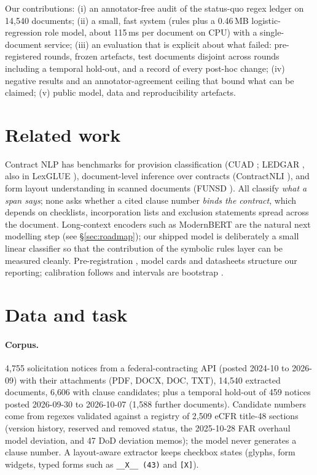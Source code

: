 \documentclass[11pt]{article}
\begin{document}
Our contributions: (i) an annotator-free audit of the status-quo regex ledger on 14{,}540 documents; (ii) a small, fast system (rules plus a 0.46\,MB logistic-regression role model, about 115\,ms per document on CPU) with a single-document service; (iii) an evaluation that is explicit about what failed: pre-registered rounds, frozen artefacts, test documents disjoint across rounds including a temporal hold-out, and a record of every post-hoc change; (iv) negative results and an annotator-agreement ceiling that bound what can be claimed; (v) public model, data and reproducibility artefacts.

\section{Related work}
Contract NLP has benchmarks for provision classification (CUAD \cite{hendrycks2021cuad}; LEDGAR \cite{tuggener2020ledgar}, also in LexGLUE \cite{chalkidis2022lexglue}), document-level inference over contracts (ContractNLI \cite{koreeda2021contractnli}), and form layout understanding in scanned documents (FUNSD \cite{jaume2019funsd}). All classify \emph{what a span says}; none asks whether a cited clause number \emph{binds the contract}, which depends on checklists, incorporation lists and exclusion statements spread across the document. Long-context encoders such as ModernBERT \cite{warner2024modernbert} are the natural next modelling step (see \S\ref{sec:roadmap}); our shipped model is deliberately a small linear classifier so that the contribution of the symbolic rules layer can be measured cleanly. Pre-registration \cite{nosek2018preregistration}, model cards \cite{mitchell2019modelcards} and datasheets \cite{gebru2021datasheets} structure our reporting; calibration follows \cite{guo2017calibration} and intervals are bootstrap \cite{efron1993bootstrap}.

\section{Data and task}
\paragraph{Corpus.} 4{,}755 solicitation notices from a federal-contracting API (posted 2024-10 to 2026-09) with their attachments (PDF, DOCX, DOC, TXT), 14{,}540 extracted documents, 6{,}606 with clause candidates; plus a temporal hold-out of 459 notices posted 2026-09-30 to 2026-10-07 (1{,}588 further documents). Candidate numbers come from regexes validated against a registry of 2{,}509 eCFR title-48 sections (version history, reserved and removed status, the 2025-10-28 FAR overhaul model deviation, and 47 DoD deviation memos); the model never generates a clause number. A layout-aware extractor keeps checkbox states (glyphs, form widgets, typed forms such as \texttt{\_\_X\_\_ (43)} and \texttt{[X]}).
\end{document}
